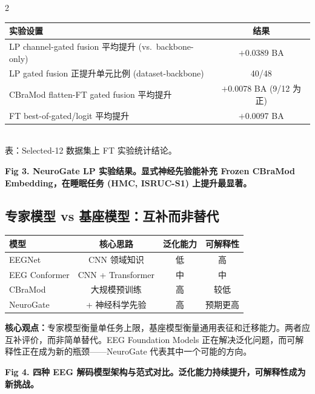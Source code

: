 \documentclass[12pt, a0paper]{article}
\renewcommand{\small}{\fontsize{18}{24}\selectfont}
\renewcommand{\footnotesize}{\fontsize{15}{20}\selectfont}
\newcommand{\figcaption}[1]{%
    \vspace{0.3em}
    {\color{myblue}\bfseries #1}
    \vspace{0.2em}
}
\begin{document}
\begin{multicols}{2}
{\footnotesize
\begin{center}
\begin{tabular}{lc}
\toprule
\textbf{实验设置} & \textbf{结果} \\
\midrule
LP channel-gated fusion 平均提升 (vs.\ backbone-only) & \cellcolor{mygreen!15}\(+\)0.0389 BA \\
LP gated fusion 正提升单元比例 (dataset-backbone) & 40/48 \\
CBraMod flatten-FT gated fusion 平均提升 & \(+\)0.0078 BA (9/12 为正) \\
FT best-of-gated/logit 平均提升 & \(+\)0.0097 BA \\
\bottomrule
\end{tabular}
\\[4pt]
{\small\color{mygray}表：Selected-12 数据集上 FT 实验统计结论。}
\end{center}
}

\figcaption{Fig 3. NeuroGate LP 实验结果。显式神经先验能补充 Frozen CBraMod Embedding，在睡眠任务 (HMC, ISRUC-S1) 上提升最显著。}

\subsection{专家模型 vs 基座模型：互补而非替代}

\begin{center}
{\small
{}
\begin{tabular}{lccc}
\toprule
\textbf{模型} & \textbf{核心思路} & \textbf{泛化能力} & \textbf{可解释性} \\
\midrule
EEGNet & CNN 领域知识 & 低 & 高 \\
EEG Conformer & CNN + Transformer & 中 & 中 \\
CBraMod & 大规模预训练 & 高 & 较低 \\
NeuroGate & + 神经科学先验 & 高 & 预期更高 \\
\bottomrule
\end{tabular}
}
\end{center}

\vspace{0.5em}

\textbf{核心观点：}专家模型衡量单任务上限，基座模型衡量通用表征和迁移能力。两者应互补评价，而非简单替代。EEG Foundation Models 正在解决泛化问题，而可解释性正在成为新的瓶颈——NeuroGate 代表其中一个可能的方向。

\figcaption{Fig 4. 四种 EEG 解码模型架构与范式对比。泛化能力持续提升，可解释性成为新挑战。}


\end{multicols}
\end{document}
